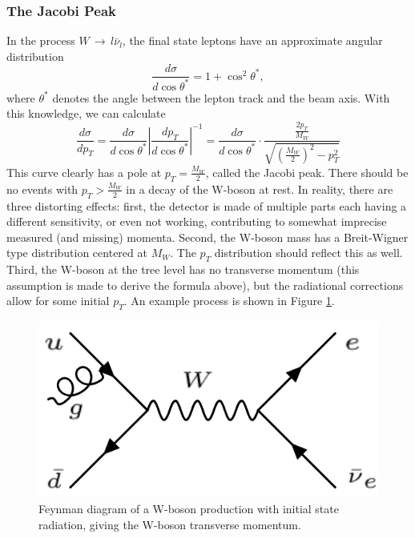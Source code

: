 \documentclass[twocolumn]{article}
\begin{document}
\subsubsection{The Jacobi Peak\cite{manual}}
In the process $W \, \rightarrow \, l \bar{\nu}_l$, the final state leptons have an approximate angular distribution
\begin{equation}
\frac{d\sigma}{d\cos \theta^*} = 1 + \cos^2 \theta^*, \nonumber
\end{equation}
where $\theta^*$ denotes the angle between the lepton track and the beam axis.
With this knowledge, we can calculate
\begin{equation}
\frac{d \sigma}{d p_T} = \frac{d \sigma}{d \cos \theta^*} \left\vert \frac{d p_T}{d \cos \theta^*} \right\vert^{-1} = \frac{d \sigma}{d \cos \theta^*} \cdot  \frac{\frac{2p_T}{M_W}}{\sqrt{\left( \frac{M_W}{2}\right)^2 - p_T^2}} \nonumber
\end{equation}
This curve clearly has a pole at $p_T = \frac{M_W}{2}$, called the Jacobi peak. There should be no events with $p_T > \frac{M_W}{2}$ in a decay of the W-boson at rest. In reality, there are three distorting effects: first, the detector is made of multiple parts each having a different sensitivity, or even not working, contributing to somewhat imprecise measured (and missing) momenta. Second, the W-boson mass has a Breit-Wigner type distribution centered at $M_W$. The $p_T$ distribution should reflect this as well. Third, the W-boson at the tree level has no transverse momentum (this assumption is made to derive the formula above), but the radiational corrections allow for some initial $p_T$. An example process is shown in Figure \ref{fig:WRadiation}. 
\begin{figure}
\centering
\includegraphics[scale=0.25]{Images/WRadiation.png}
\caption{Feynman diagram of a W-boson production with initial state radiation, giving the W-boson transverse momentum.}
\label{fig:WRadiation}
\end{figure}
\end{document}
